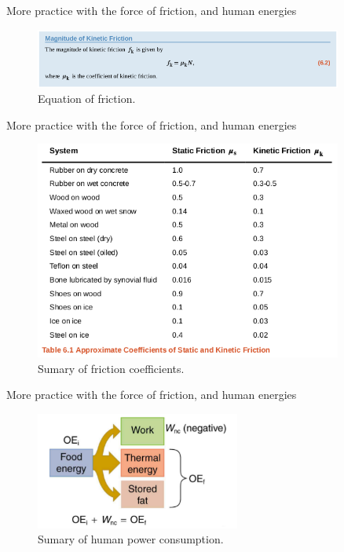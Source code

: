\documentclass{beamer}
\begin{document}
\begin{frame}{More practice with the force of friction, and human energies}
\begin{figure}
\centering
\includegraphics[width=0.9\textwidth]{friction2.png}
\caption{\label{fig:f2} Equation of friction.}
\end{figure}
\end{frame}

\begin{frame}{More practice with the force of friction, and human energies}
\begin{figure}
\centering
\includegraphics[width=0.9\textwidth]{friction3.png}
\caption{\label{fig:f2} Sumary of friction coefficients.}
\end{figure}
\end{frame}

\begin{frame}{More practice with the force of friction, and human energies}
\begin{figure}
\centering
\includegraphics[width=0.6\textwidth]{human.png}
\caption{\label{fig:f3} Sumary of human power consumption.}
\end{figure}
\end{frame}
\end{document}
